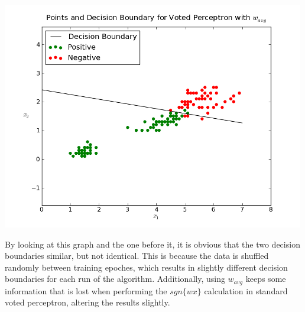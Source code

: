 \documentclass{article}
\begin{document}
\begin{enumerate}
\includegraphics{voted_perceptron_avg.png}

By looking at this graph and the one before it, it is obvious that the
two decision boundaries similar, but not identical. This is because the data
is shuffled randomly between training epoches, which results in slightly
different decision boundaries for each run of the algorithm. Additionally,
using $w_{avg}$ keeps some information that is lost when performing the
$sgn\{wx\}$ calculation in standard voted perceptron, altering the results
slightly.


\end{enumerate}
\end{document}
